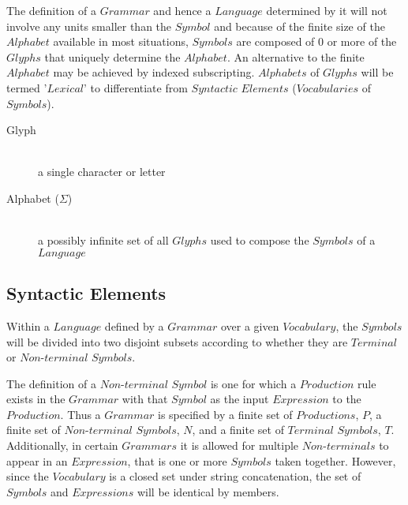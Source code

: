 \documentclass{article}
\begin{document}
The definition of a $Grammar$ and hence a $Language$ determined by it
will not involve any units smaller than the $Symbol$ and because of
the finite size of the $Alphabet$ available in most situations,
$Symbols$ are composed of 0 or more of the $Glyphs$ that uniquely
determine the $Alphabet$. An alternative to the finite $Alphabet$ may
be achieved by indexed subscripting. $Alphabets$ of $Glyphs$ will be
termed '$Lexical$' to differentiate from $Syntactic$ $Elements$
($Vocabularies$ of $Symbols$).

    \begin{description}

    \item[Glyph] \hfill \\
    a single character or letter

    \item[Alphabet ($\Sigma$)] \hfill \\
    a possibly infinite set of all $Glyphs$ used to compose the
    $Symbols$ of a $Language$

    \end{description}

\subsection{Syntactic Elements}

Within a $Language$ defined by a $Grammar$ over a given $Vocabulary$,
the $Symbols$ will be divided into two disjoint subsets according to
whether they are $Terminal$ or $Non$-$terminal$ $Symbols$.

The definition of a $Non$-$terminal$ $Symbol$ is one for which a
$Production$ rule exists in the $Grammar$ with that $Symbol$ as the
input $Expression$ to the $Production$. Thus a $Grammar$ is specified
by a finite set of $Productions$, $P$, a finite set of $Non$-$terminal$
$Symbols$, $N$, and a finite set of $Terminal$ $Symbols$,
$T$. Additionally, in certain $Grammars$ it is allowed for multiple
$Non$-$terminals$ to appear in an $Expression$, that is one or more
$Symbols$ taken together. However, since the $Vocabulary$ is a closed
set under string concatenation, the set of $Symbols$ and $Expressions$
will be identical by members.
\end{document}
